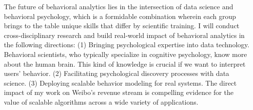 \documentclass[10.5pt]{article}
\begin{document}




The future of behavioral analytics lies in the intersection of data science and behavioral psychology, which is a formidable combination wherein each group brings to the table unique skills that differ by scientific training. I will conduct cross-disciplinary research and build real-world impact of behavioral analytics in the following directions: (1) Bringing psychological expertise into data technology. Behavioral scientists, who typically specialize in cognitive psychology, know more about the human brain. This kind of knowledge is crucial if we want to interpret users' behavior. (2) Facilitating psychological discovery processes with data science. (3) Deploying scalable behavior modeling for real systems. The direct impact of my work on Weibo's revenue stream is compelling evidence for the value of scalable algorithms across a wide variety of applications.
\end{document}
